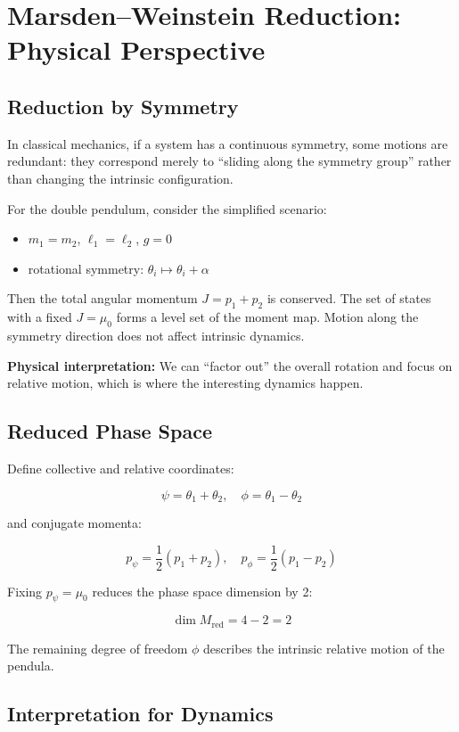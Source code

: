 \documentclass[11pt]{book}
\begin{document}
\chapter{Marsden--Weinstein Reduction: Physical Perspective}

\section{Reduction by Symmetry}

In classical mechanics, if a system has a continuous symmetry, some motions are redundant: they correspond merely to “sliding along the symmetry group” rather than changing the intrinsic configuration.

For the double pendulum, consider the simplified scenario:

\begin{itemize}
    \item $m_1=m_2$, $\ell_1=\ell_2$, $g=0$
    \item rotational symmetry: $\theta_i \mapsto \theta_i + \alpha$
\end{itemize}

Then the total angular momentum $J=p_1+p_2$ is conserved. The set of states with a fixed $J=\mu_0$ forms a level set of the moment map. Motion along the symmetry direction does not affect intrinsic dynamics. 

\textbf{Physical interpretation:} We can “factor out” the overall rotation and focus on relative motion, which is where the interesting dynamics happen.

\section{Reduced Phase Space}

Define collective and relative coordinates:

\[
\psi = \theta_1 + \theta_2, \quad \phi = \theta_1 - \theta_2
\]

and conjugate momenta:

\[
p_\psi = \frac{1}{2}(p_1+p_2), \quad p_\phi = \frac{1}{2}(p_1 - p_2)
\]

Fixing $p_\psi = \mu_0$ reduces the phase space dimension by 2:

\[
\dim M_{\text{red}} = 4-2=2
\]

The remaining degree of freedom $\phi$ describes the intrinsic relative motion of the pendula.

\section{Interpretation for Dynamics}
\end{document}
